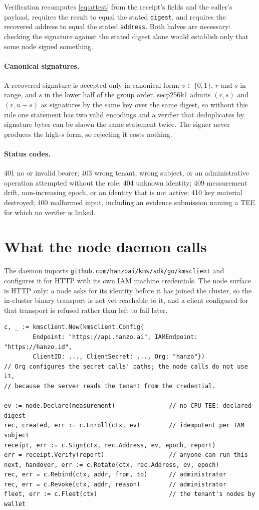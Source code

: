 \documentclass[11pt,a4paper]{article}
\newcommand{\code}[1]{\texttt{#1}}
\begin{document}
Verification recomputes \eqref{eq:attest} from the receipt's fields and the
caller's payload, requires the result to equal the stated \code{digest}, and
requires the recovered address to equal the stated \code{address}. Both halves
are necessary: checking the signature against the stated digest alone would
establish only that some node signed something.

\paragraph{Canonical signatures.} A recovered signature is accepted only in
canonical form: $v \in \{0,1\}$, $r$ and $s$ in range, and $s$ in the lower half
of the group order. secp256k1 admits $(r,s)$ and $(r, n-s)$ as signatures by the
same key over the same digest, so without this rule one statement has two valid
encodings and a verifier that deduplicates by signature bytes can be shown the
same statement twice. The signer never produces the high-$s$ form, so rejecting
it costs nothing.

\paragraph{Status codes.} 401 no or invalid bearer; 403 wrong tenant, wrong
subject, or an administrative operation attempted without the role; 404 unknown
identity; 409 measurement drift, non-increasing epoch, or an identity that is not
active; 410 key material destroyed; 400 malformed input, including an evidence
submission naming a TEE for which no verifier is linked.

\section{What the node daemon calls}

The daemon imports \code{github.com/hanzoai/kms/sdk/go/kmsclient} and configures
it for HTTP with its own IAM machine credentials. The node surface is HTTP only:
a node asks for its identity before it has joined the cluster, so the in-cluster
binary transport is not yet reachable to it, and a client configured for that
transport is refused rather than left to fail later.

\begin{verbatim}
c, _ := kmsclient.New(kmsclient.Config{
        Endpoint: "https://api.hanzo.ai", IAMEndpoint: "https://hanzo.id",
        ClientID: ..., ClientSecret: ..., Org: "hanzo"})
// Org configures the secret calls' paths; the node calls do not use it,
// because the server reads the tenant from the credential.

ev := node.Declare(measurement)               // no CPU TEE: declared digest
rec, created, err := c.Enroll(ctx, ev)        // idempotent per IAM subject
receipt, err := c.Sign(ctx, rec.Address, ev, epoch, report)
err = receipt.Verify(report)                  // anyone can run this
next, handover, err := c.Rotate(ctx, rec.Address, ev, epoch)
rec, err = c.Rebind(ctx, addr, from, to)      // administrator
rec, err = c.Revoke(ctx, addr, reason)        // administrator
fleet, err := c.Fleet(ctx)                    // the tenant's nodes by wallet
\end{verbatim}
\end{document}
